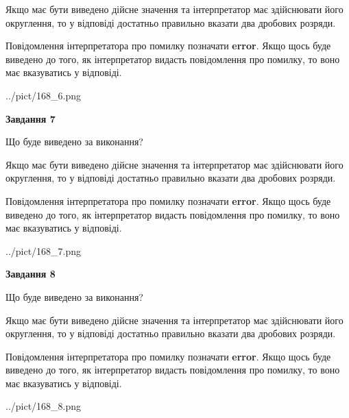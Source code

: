 \documentclass[12pt, ukrainian]{article}
\begin{document}
{\begin {Large}
Якщо має бути виведено дійсне значення та інтерпретатор має здійснювати його округлення, 
то у відповіді достатньо правильно вказати два дробових розряди.

Повідомлення інтерпретатора про помилку позначати \textbf{error}.
Якщо щось буде виведено до того, як інтерпретатор видасть повідомлення про помилку, 
то воно має вказуватись у відповіді. \par

\begin{center}
	{../pict/168_6.png}
\end{center}
\newpage

{\begin {center}\textbf{Завдання 7}\end {center}}\par
Що буде виведено за виконання? \par

Якщо має бути виведено дійсне значення та інтерпретатор має здійснювати його округлення, 
то у відповіді достатньо правильно вказати два дробових розряди.

Повідомлення інтерпретатора про помилку позначати \textbf{error}.
Якщо щось буде виведено до того, як інтерпретатор видасть повідомлення про помилку, 
то воно має вказуватись у відповіді. \par

\begin{center}
	{../pict/168_7.png}
\end{center}
\newpage

{\begin {center}\textbf{Завдання 8}\end {center}}\par
Що буде виведено за виконання? \par

Якщо має бути виведено дійсне значення та інтерпретатор має здійснювати його округлення, 
то у відповіді достатньо правильно вказати два дробових розряди.

Повідомлення інтерпретатора про помилку позначати \textbf{error}.
Якщо щось буде виведено до того, як інтерпретатор видасть повідомлення про помилку, 
то воно має вказуватись у відповіді. \par

\begin{center}
	{../pict/168_8.png}
\end{center}
\newpage


\end{Large}}
\end{document}
